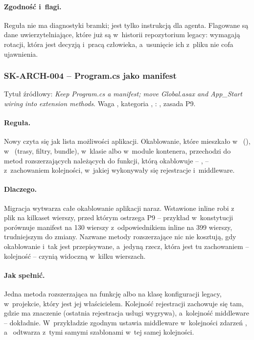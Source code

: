 \paragraph{Zgodność i~flagi.} Reguła nie ma diagnostyki bramki; jest tylko instrukcją dla
agenta. Flagowane są dane uwierzytelniające, które już są w~historii repozytorium legacy:
wymagają rotacji, która jest decyzją i~pracą człowieka, a~usunięcie ich z~pliku nie cofa
ujawnienia.


\subsubsection{SK-ARCH-004 -- Program.cs jako manifest}\label{sec:standardy-sk-arch-004}

Tytuł źródłowy: \emph{Keep Program.cs a manifest; move Global.asax and App\_Start wiring
into extension methods}. Waga , kategoria ,
: , zasada P9.

\paragraph{Reguła.} Nowy  czyta się jak lista możliwości aplikacji.
Okablowanie, które mieszkało w~ (),
w~ (trasy, filtry, bundle), w~klasie  albo
w~module kontenera, przechodzi do metod rozszerzających należących do funkcji, którą
okablowuje -- ,  --
z~zachowaniem kolejności, w~jakiej wykonywały się rejestracje i~middleware.

\paragraph{Dlaczego.} Migracja wytwarza całe okablowanie aplikacji naraz. Wstawione inline
robi z~ plik na kilkaset wierszy, przed którym ostrzega P9 -- przykład
w~konstytucji porównuje manifest na 130 wierszy z~odpowiednikiem inline na 399 wierszy,
trudniejszym do zmiany. Nazwane metody rozszerzające nic nie kosztują, gdy okablowanie i~tak
jest przepisywane, a~jedyną rzecz, która jest tu zachowaniem -- kolejność -- czynią widoczną
w~kilku wierszach.

\paragraph{Jak spełnić.} Jedna metoda rozszerzająca na funkcję albo na klasę konfiguracji
legacy, w~projekcie, który jest jej właścicielem. Kolejność rejestracji zachowuje się tam,
gdzie ma znaczenie (ostatnia rejestracja usługi wygrywa), a~kolejność middleware --
dokładnie. W~przykładzie zgodnym  ustawia middleware
w~kolejności zdarzeń , a~ odtwarza
 z~tymi samymi szablonami w~tej samej kolejności.

